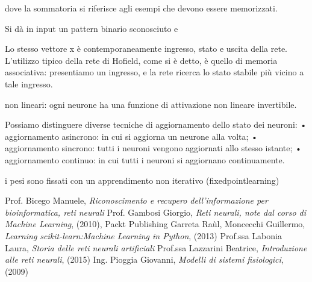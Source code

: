 \documentclass[12pt,a4paper,oneside]{book}
\begin{document}
	dove la sommatoria si riferisce agli esempi che devono essere memorizzati.
	
	
	
	Si dà in input un pattern binario sconosciuto e 
	
	 
	Lo stesso vettore x è contemporaneamente ingresso, stato e uscita della rete. L’utilizzo tipico della rete di Hofield, come si è detto, è quello di memoria associativa: presentiamo un ingresso, e la rete ricerca lo stato stabile più vicino a tale ingresso.



non lineari: ogni neurone ha una funzione di attivazione non lineare invertibile. 

Possiamo distinguere diverse tecniche di aggiornamento dello stato dei neuroni: • aggiornamento asincrono: in cui si aggiorna un neurone alla volta; • aggiornamento sincrono: tutti i neuroni vengono aggiornati allo stesso istante; • aggiornamento continuo: in cui tutti i neuroni si aggiornano continuamente. 
 

i pesi sono fissati con un apprendimento non iterativo (fixedpointlearning) \\





\begin{thebibliography}{9} 
	 Prof. Bicego Manuele, \emph{Riconoscimento e recupero dell’informazione per bioinformatica, reti neurali}
	 Prof. Gambosi Giorgio, \emph{Reti neurali, note dal corso di Machine Learning}, (2010), Packt Publishing 
	 Garreta Raùl, Moncecchi Guillermo, \emph{Learning scikit-learn:Machine Learning in Python}, (2013) 
	 Prof.ssa Labonia Laura, \emph{Storia delle reti neurali artificiali}
	 Prof.ssa Lazzarini Beatrice, \emph{Introduzione alle reti neurali}, (2015)
	 Ing. Pioggia Giovanni, \emph{Modelli di sistemi fisiologici}, (2009)
 \end{thebibliography}
	
\end{document}
